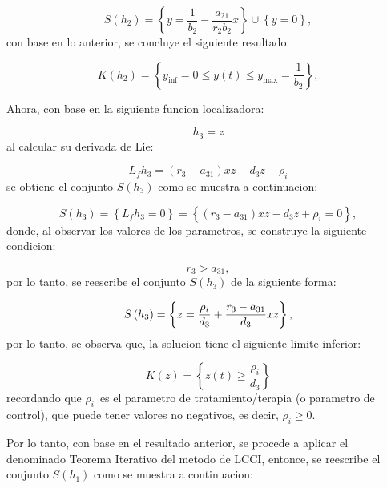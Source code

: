 \documentclass[letterpaper,11pt]{article}
\begin{document}
\begin{equation*}
S(h_{2})=\left\{ y=\frac{1}{b_{2}}-\frac{a_{21}}{r_{2}b_{2}}x\right\} \cup
\left\{ y=0\right\} ,
\end{equation*}%
con base en lo anterior, se concluye el siguiente resultado:

\begin{equation*}
K\left( h_{2}\right) =\left\{ y_{\inf }=0\leq y\left( t\right) \leq y_{\max
}=\frac{1}{b_{2}}\right\} ,
\end{equation*}

Ahora, con base en la siguiente funcion localizadora:

\begin{equation*}
h_{3}=z
\end{equation*}%
al calcular su derivada de Lie:

\begin{equation*}
L_{f}h_{3}=(r_{3}-a_{31})xz-d_{3}z+\rho _{i}
\end{equation*}%
se obtiene el conjunto $S\left( h_{3}\right) $ como se muestra a
continuacion:

\begin{equation*}
S\left( h_{3}\right) =\left\{ L_{f}h_{3}=0\right\} =\left\{ \left(
r_{3}-a_{31}\right) xz-d_{3}z+\rho _{i}=0\right\} ,
\end{equation*}%
donde, al observar los valores de los parametros, se construye la siguiente
condicion:

\begin{equation*}
r_{3}>a_{31},
\end{equation*}%
por lo tanto, se reescribe el conjunto $S\left( h_{3}\right) $ de la
siguiente forma:

\begin{equation*}
S\left( h_{3}\right) =\left\{ z=\frac{\rho _{i}}{d_{3}}+\frac{r_{3}-a_{31}}{%
d_{3}}xz\right\} ,
\end{equation*}%
por lo tanto, se observa que, la solucion tiene el siguiente limite inferior:

\begin{equation*}
K\left( z\right) =\left\{ z\left( t\right) \geq \frac{\rho _{i}}{d_{3}}%
\right\}
\end{equation*}%
recordando que $\rho _{i}$\bigskip\ es el parametro de tratamiento/terapia
(o parametro de control), que puede tener valores no negativos, es decir, $%
\rho _{i}\geq 0$.

Por lo tanto, con base en el resultado anterior, se procede a aplicar el
denominado Teorema Iterativo del metodo de LCCI, entonce, se reescribe el
conjunto $S\left( h_{1}\right) $ como se muestra a continuacion:
\end{document}
